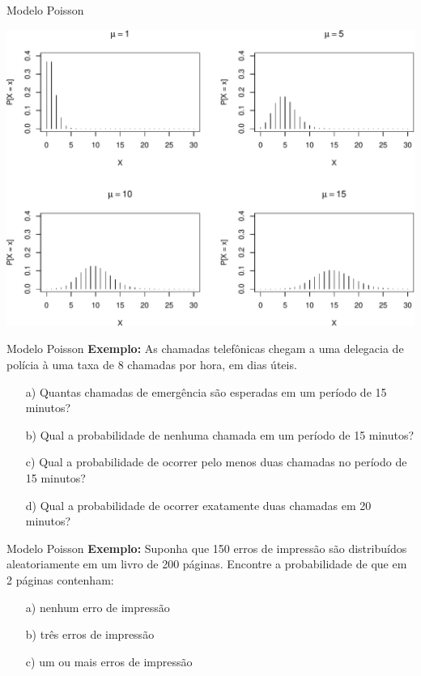 \documentclass[10pt]{beamer}\usepackage[]{graphicx}\usepackage[]{color}
\newenvironment{knitrout}{}{} %
\theoremstyle{definition}
\begin{document}
\begin{frame}[fragile]{Modelo Poisson}
\begin{knitrout}\footnotesize
{}\color{fgcolor}

{\centering \includegraphics[width=1\textwidth]{figure/unnamed-chunk-3-1} 

}



\end{knitrout}
\end{frame}

\begin{frame}[fragile]{Modelo Poisson}
  \textbf{Exemplo:} As chamadas telefônicas chegam a uma delegacia de
  polícia à uma taxa de 8 chamadas por hora, em dias úteis.
  \begin{itemize}
  \item[a)] Quantas chamadas de emergência são esperadas em um período
    de 15 minutos?
  \item[b)] Qual a probabilidade de nenhuma chamada em um período de 15
    minutos?
  \item[c)] Qual a probabilidade de ocorrer pelo menos duas chamadas no
    período de 15 minutos?
  \item[d)] Qual a probabilidade de ocorrer exatamente duas chamadas em
    20 minutos?
  \end{itemize}
\end{frame}

\begin{frame}[fragile]{Modelo Poisson}
  \textbf{Exemplo:} Suponha que 150 erros de impressão são distribuídos
  aleatoriamente em um livro de 200 páginas. Encontre a probabilidade de
  que em 2 páginas contenham:
  \begin{itemize}
  \item[a)] nenhum erro de impressão
  \item[b)] três erros de impressão
  \item[c)] um ou mais erros de impressão
  \end{itemize}
\end{frame}
\end{document}
